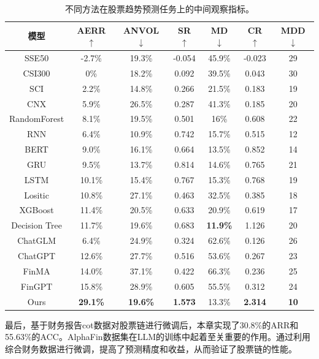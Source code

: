\begin{table}
	\caption{\label{obv_indice_table}不同方法在股票趋势预测任务上的中间观察指标。}
	\centering{}%
	\small 
	\begin{tabular}{ccccccc}
		\toprule[2pt]
		模型 & AERR $\uparrow$ & ANVOL $\downarrow$ & SR $\uparrow$ & MD $\downarrow$ & CR $\uparrow$ & MDD $\downarrow$ \\
		\hline
		SSE50 & -2.7\% & 19.3\% & -0.054 & 45.9\% & -0.023 & 29 \\
		CSI300 & 0\% & 18.2\% & 0.092 & 39.5\% & 0.043 & 30 \\
		SCI & 2.2\% & 14.8\% & 0.266 & 21.5\% & 0.183 & 19 \\
		CNX & 5.9\% & 26.5\% & 0.287 & 41.3\% & 0.185 & 20 \\
		\hline
		RandomForest & 8.1\% & 19.5\% & 0.501 & 16\% & 0.608 & 22 \\
		RNN & 6.4\% & 10.9\% & 0.742 & 15.7\% & 0.515 & 12 \\
		BERT & 9.0\% & 16.1\% & 0.664 & 13.5\% & 0.852 & 14 \\
		GRU & 9.5\% & 13.7\% & 0.814 & 14.6\% & 0.765 & 21 \\
		LSTM & 10.1\% & 15.4\% & 0.767 & 15.3\% & 0.768 & 19 \\
		Lositic & 10.8\% & 27.1\% & 0.463 & 32.5\% & 0.385 & 18 \\
		XGBoost & 11.4\% & 20.5\% & 0.633 & 20.9\% & 0.619 & 17 \\
		Decision Tree & 11.7\% & 19.6\% & 0.683 & \textbf{11.9\%} & 1.126 & 20 \\
		\hline
		ChatGLM & 6.4\% & 24.9\% & 0.324 & 62.6\% & 0.126 & 26 \\
		ChatGPT & 12.6\% & 27.7\% & 0.516 & 53.6\% & 0.267 & 23 \\
		FinMA & 14.0\% & 37.1\% & 0.422 & 66.3\% & 0.236 & 25 \\
		FinGPT & 15.8\% & 28.9\% & 0.605 & 55.5\% & 0.312 & 24 \\
		\hline
		Ours & \textbf{29.1\%} & \textbf{19.6\%} & \textbf{1.573} & 13.3\% & \textbf{2.314} & \textbf{10} \\
		\bottomrule[2pt]
	\end{tabular}
\end{table}

最后，基于财务报告cot数据对股票链进行微调后，本章实现了30.8\%的ARR和55.63\%的ACC。AlphaFin数据集在LLM的训练中起着至关重要的作用。通过利用综合财务数据进行微调，提高了预测精度和收益，从而验证了股票链的性能。

